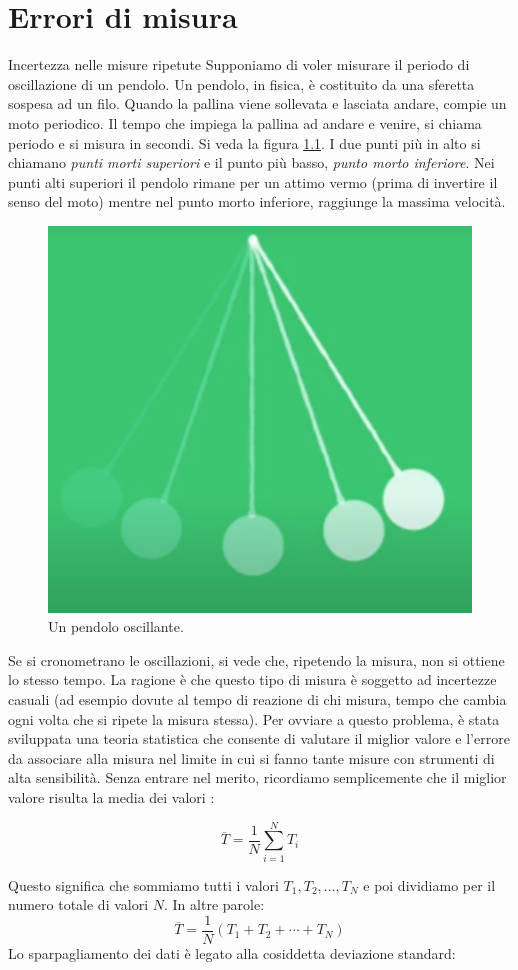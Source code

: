 \documentclass[12pt,a4paper,oneside]{book}
\makeatletter
\renewcommand{\section}{\@startsection{section}{1}{\z@}
{-4ex \@plus -1ex \@minus -.4ex}
{1ex \@plus.2ex }
{\normalfont\large\sffamily\bfseries}}
\theoremstyle{esercizio}
\makeatother
\begin{document}
\chapter{Errori di misura}
\section{Incertezza nelle misure ripetute }
Supponiamo di voler misurare il periodo di oscillazione di un pendolo. Un pendolo, in fisica, è costituito da una sferetta sospesa ad un filo. Quando la pallina viene sollevata e lasciata andare, compie un moto periodico. Il tempo che impiega la pallina ad andare e venire, si chiama periodo e si misura in secondi. Si veda la figura \ref{fig:pendolo}. I due punti più in alto si chiamano \textit{punti morti superiori} e il punto più basso, \textit{punto morto inferiore}. Nei punti alti superiori il pendolo rimane per un attimo vermo (prima di invertire il senso del moto) mentre nel punto morto inferiore, raggiunge la massima velocità.

   \begin{figure}[h!]
    \centering
    \includegraphics[width=0.3\linewidth]{path_to_image/pendolo.png} 
    \caption{Un pendolo oscillante.}
    \label{fig:pendolo}
\end{figure}  


Se si cronometrano le oscillazioni, si vede che, ripetendo la misura, non si ottiene lo stesso tempo. La ragione è che questo tipo di misura è soggetto ad incertezze casuali (ad esempio dovute al tempo di reazione di chi misura, tempo che cambia ogni volta che si ripete la misura stessa). Per ovviare a questo problema, è stata sviluppata una teoria statistica che consente di valutare il miglior valore e l'errore da associare alla misura nel limite in cui si fanno tante misure con strumenti di alta sensibilità. Senza entrare nel merito, ricordiamo semplicemente che il miglior valore risulta la media dei valori :

\[
\overline{T} = \frac{1}{N} \sum_{i=1}^{N} T_i
\]

\noindent
Questo significa che sommiamo tutti i valori $T_1, T_2, \ldots, T_N$ e poi dividiamo per il numero totale di valori $N$. In altre parole:
\[
\overline{T} = \frac{1}{N} (T_1 + T_2 + \cdots + T_N)
\]
Lo sparpagliamento dei dati  è legato alla cosiddetta deviazione standard:
\end{document}
